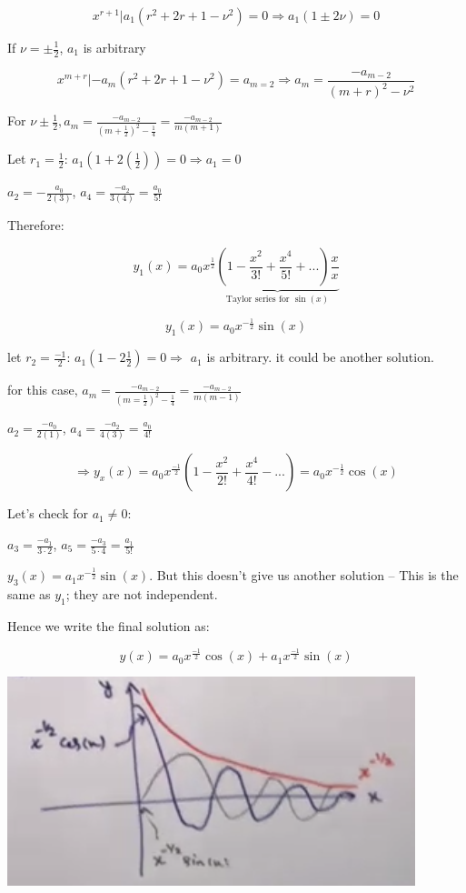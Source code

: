 $$x^{r+1} | a_1 (r^2 + 2r + 1 - \nu^2) = 0 \Rightarrow a_1 (1 \pm 2 \nu) = 0$$

If $\nu = \pm \frac{1}{2}$, $a_1$ is arbitrary

$$x^{m+r} | -a_m (r^2 + 2r + 1 - \nu^2) = a_{m=2} \Rightarrow a_m = \frac{-a_{m-2}}{(m+r)^2 - \nu^2}$$

For $\nu \pm \frac{1}{2}, a_m = \frac{-a_{m-2}}{(m+\frac{1}{2})^2 - \frac{1}{4}} = \frac{-a_{m-2}}{m(m+1)}$

Let $r_1 = \frac{1}{2}$: $a_1 (1 + 2 (\frac{1}{2})) = 0 \Rightarrow a_1 = 0$

$a_2 = - \frac{a_0}{2(3)}$, $a_4 = \frac{-a_2}{3(4)} = \frac{a_0}{5!}$

Therefore:

$$y_1 (x) = a_0 x^{\frac{1}{2}} \underbrace{\left(1 - \frac{x^2}{3!} + \frac{x^4}{5!} + ... \right) \frac{x}{x}}_{\text{Taylor series for } \sin(x)}$$

$$y_1(x) = a_0 x^{- \frac{1}{2}} \sin(x)$$

let $r_2 = \frac{-1}{2}$: $a_1 (1 - 2 \frac{1}{2}) = 0 \Rightarrow$ $a_1$ is arbitrary. it could be another solution.


for this case, $a_m = \frac{-a_{m - 2}}{(m = \frac{1}{2})^2 - \frac{1}{4}} = \frac{-a_{m - 2}}{m(m-1)}$

$a_2 = \frac{-a_0}{2(1)}$, $a_4 = \frac{-a_2}{4(3)} = \frac{a_0}{4!}$

$$\Rightarrow y_x(x) = a_0 x^{\frac{-1}{2}} \left(1 - \frac{x^2}{2!} + \frac{x^4}{4!} - ... \right) = a_0 x^{- \frac{1}{2}} \cos(x)$$

Let's check for $a_1 \neq 0$:

$a_3 = \frac{-a_1}{3 \cdot 2}$, $a_5 = \frac{-a_3}{5 \cdot 4} = \frac{a_1}{5!}$

$y_3 (x) = a_1 x^{- \frac{1}{2}} \sin(x)$. But this doesn't give us another solution -- This is the same as $y_1$; they are not independent. 

Hence we write the final solution as:

$$y(x) = a_0 x^{\frac{-1}{2}} \cos(x) + a_1 x^{\frac{-1}{2}} \sin(x)$$

\includegraphics[width = 0.9 \textwidth]{image5.png}

